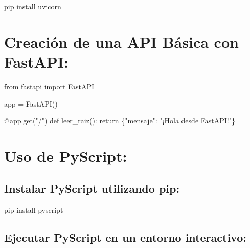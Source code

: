 \documentclass[
  a4paper,
  onepage,
  openany]{scrreprt}
\newenvironment{Shaded}{\begin{snugshade}}{\end{snugshade}}
\newcommand{\AttributeTok}[1]{\textcolor[rgb]{0.40,0.45,0.13}{#1}}
\newcommand{\ControlFlowTok}[1]{\textcolor[rgb]{0.00,0.23,0.31}{#1}}
\newcommand{\ExtensionTok}[1]{\textcolor[rgb]{0.00,0.23,0.31}{#1}}
\newcommand{\ImportTok}[1]{\textcolor[rgb]{0.00,0.46,0.62}{#1}}
\newcommand{\KeywordTok}[1]{\textcolor[rgb]{0.00,0.23,0.31}{#1}}
\newcommand{\NormalTok}[1]{\textcolor[rgb]{0.00,0.23,0.31}{#1}}
\newcommand{\OperatorTok}[1]{\textcolor[rgb]{0.37,0.37,0.37}{#1}}
\newcommand{\StringTok}[1]{\textcolor[rgb]{0.13,0.47,0.30}{#1}}
\begin{document}
\begin{Shaded}
\begin{Highlighting}[]
\ExtensionTok{pip}\NormalTok{ install uvicorn}
\end{Highlighting}
\end{Shaded}

\hypertarget{creaciuxf3n-de-una-api-buxe1sica-con-fastapi-1}{%
\section{Creación de una API Básica con
FastAPI:}\label{creaciuxf3n-de-una-api-buxe1sica-con-fastapi-1}}

\begin{Shaded}
\begin{Highlighting}[]
\ImportTok{from}\NormalTok{ fastapi }\ImportTok{import}\NormalTok{ FastAPI}

\NormalTok{app }\OperatorTok{=}\NormalTok{ FastAPI()}

\AttributeTok{@app.get}\NormalTok{(}\StringTok{"/"}\NormalTok{)}
\KeywordTok{def}\NormalTok{ leer\_raiz():}
    \ControlFlowTok{return}\NormalTok{ \{}\StringTok{"mensaje"}\NormalTok{: }\StringTok{"¡Hola desde FastAPI!"}\NormalTok{\}}
\end{Highlighting}
\end{Shaded}

\hypertarget{uso-de-pyscript-1}{%
\section{Uso de PyScript:}\label{uso-de-pyscript-1}}

\hypertarget{instalar-pyscript-utilizando-pip-1}{%
\subsection{Instalar PyScript utilizando
pip:}\label{instalar-pyscript-utilizando-pip-1}}

\begin{Shaded}
\begin{Highlighting}[]
\ExtensionTok{pip}\NormalTok{ install pyscript}
\end{Highlighting}
\end{Shaded}

\hypertarget{ejecutar-pyscript-en-un-entorno-interactivo-1}{%
\subsection{Ejecutar PyScript en un entorno
interactivo:}\label{ejecutar-pyscript-en-un-entorno-interactivo-1}}
\end{document}
